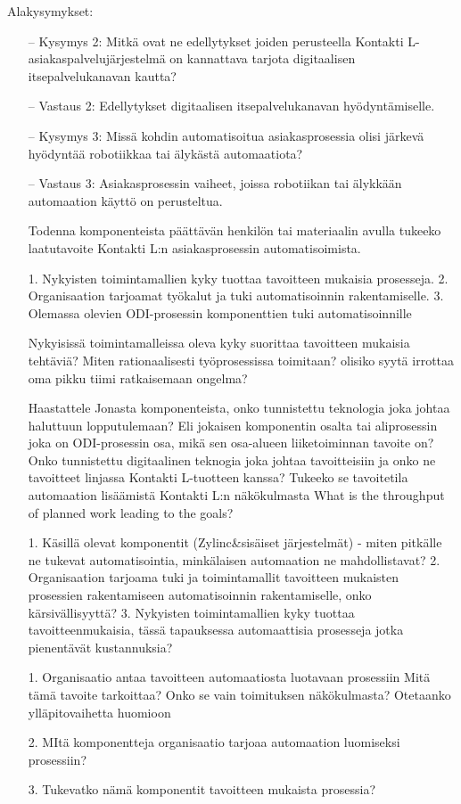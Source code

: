 \documentclass[finnish,12pt,a4paper,pdftex]{article}
\begin{document}
Alakysymykset:
\begin{itemize}
\item[--]Kysymys 2: Mitkä ovat ne edellytykset joiden perusteella Kontakti L- asiakaspalvelujärjestelmä on kannattava tarjota digitaalisen itsepalvelukanavan kautta?
\item[--]Vastaus 2: Edellytykset digitaalisen itsepalvelukanavan hyödyntämiselle.
\item[--]Kysymys 3: Missä kohdin automatisoitua asiakasprosessia olisi järkevä hyödyntää robotiikkaa tai älykästä automaatiota?
\item[--]Vastaus 3: Asiakasprosessin vaiheet, joissa robotiikan tai älykkään automaation käyttö on perusteltua.

Todenna komponenteista päättävän henkilön tai materiaalin avulla tukeeko laatutavoite Kontakti L:n asiakasprosessin automatisoimista. 

1. Nykyisten toimintamallien kyky tuottaa tavoitteen mukaisia prosesseja. 
2. Organisaation tarjoamat työkalut ja tuki automatisoinnin rakentamiselle.
3. Olemassa olevien ODI-prosessin komponenttien tuki automatisoinnille

Nykyisissä toimintamalleissa oleva kyky suorittaa tavoitteen mukaisia tehtäviä?
Miten rationaalisesti työprosessissa toimitaan?
olisiko syytä irrottaa oma pikku tiimi ratkaisemaan ongelma?

Haastattele Jonasta komponenteista, onko tunnistettu teknologia joka johtaa haluttuun lopputulemaan?
Eli jokaisen komponentin osalta tai aliprosessin joka on ODI-prosessin osa, mikä sen osa-alueen liiketoiminnan tavoite on? Onko tunnistettu digitaalinen teknogia joka johtaa tavoitteisiin ja onko ne tavoitteet linjassa Kontakti L-tuotteen kanssa? Tukeeko se tavoitetila automaation lisäämistä Kontakti L:n näkökulmasta
What is the throughput of planned work leading to the goals? 

1. Käsillä olevat komponentit (Zylinc&sisäiset järjestelmät) - miten pitkälle ne tukevat automatisointia, 
minkälaisen automaation ne mahdollistavat?
2. Organisaation tarjoama tuki ja toimintamallit tavoitteen mukaisten prosessien rakentamiseen
automatisoinnin rakentamiselle, onko kärsivällisyyttä?
3. Nykyisten toimintamallien kyky tuottaa tavoitteenmukaisia, 
tässä tapauksessa automaattisia prosesseja jotka pienentävät kustannuksia? 

1. Organisaatio antaa tavoitteen automaatiosta luotavaan prosessiin
Mitä tämä tavoite tarkoittaa? Onko se vain toimituksen näkökulmasta? Otetaanko ylläpitovaihetta huomioon

2. MItä komponentteja organisaatio tarjoaa automaation luomiseksi prosessiin? 

3. Tukevatko nämä komponentit tavoitteen mukaista prosessia?

\end{itemize}
\end{document}
